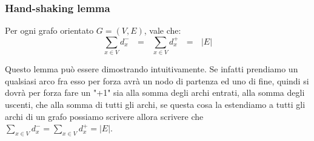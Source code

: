 \subsubsection{Hand-shaking lemma}
\begin{proposition}
Per ogni grafo orientato $G = (V,E)$, vale che:
\begin{equation}\label{hand-shaking-lemma}
    \sum\limits_{x \in V}d^-_x \: \: \: = \: \: \: \sum\limits_{x \in V}d^+_x \: \: \: = \: \: \: |E|
\end{equation}
\end{proposition}
Questo lemma può essere dimostrando intuitivamente. Se infatti prendiamo un qualsiasi arco fra esso per forza avrà un nodo di partenza ed uno di fine, quindi si dovrà per forza fare un "+1" sia alla somma degli archi entrati, alla somma degli uscenti, che alla somma di tutti gli archi, se questa cosa la estendiamo a tutti gli archi di un grafo possiamo scrivere allora scrivere che $\sum\limits_{x \in V}d^-_x = \sum\limits_{x \in V}d^+_x = |E|$.
